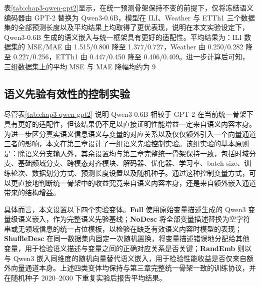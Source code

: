 表\ref{tab:chap3-qwen-gpt2}显示，在统一预测骨架保持不变的前提下，仅将冻结语义编码器由 GPT-2 替换为 Qwen3-0.6B，模型在 ILI、Weather 与 ETTh1 三个数据集的全部预测长度以及平均结果上均取得了更优表现，说明在本文实验设定下，Qwen3-0.6B 生成的语义嵌入与统一框架具有更好的适配性。平均结果为：ILI 数据集的 MSE/MAE 由 1.515/0.800 降至 1.377/0.727，Weather 由 0.250/0.282 降至 0.227/0.256，ETTh1 由 0.447/0.450 降至 0.406/0.409。进一步计算后可知，三组数据集上的平均 MSE 与 MAE 降幅均约为 9%

\subsection{语义先验有效性的控制实验}
尽管表\ref{tab:chap3-qwen-gpt2} 说明 Qwen3-0.6B 相较于 GPT-2 在当前统一骨架下具有更好的适配性，但该结果仍不足以直接证明性能增益一定来自语义内容本身。为进一步区分真实语义信息语义与变量的对应关系以及仅仅额外引入一个向量通道三者的影响，本文在第三章设计了一组语义先验控制实验。该组实验的基本原则是：除语义分支输入外，其余设置均与第三章完整统一骨架保持一致，包括时域分支、基础频域分支、跨模态对齐模块、解码器、优化器、学习率、batch size、训练轮次、数据划分方式、预测长度设置以及随机种子。通过这种控制变量方式，可以更直接地判断统一骨架中的收益究竟来自语义内容本身，还是来自额外嵌入通道带来的结构增益。

具体而言，本文设置以下四个实验变体。\textbf{Full} 使用原始变量描述生成的 Qwen3 变量级语义嵌入，作为完整语义先验基线；\textbf{NoDesc} 将全部变量描述替换为空字符串或无领域信息的统一占位模板，以检验在缺乏有效语义内容时模型的表现；\textbf{ShuffleDesc} 在同一数据集内固定一次随机置换，将变量描述错误地分配给其他变量，用于检验语义描述与变量之间的正确对应关系是否关键；\textbf{RandEmb} 则以与 Qwen3 嵌入同维度的随机向量替代语义嵌入，用于检验性能收益是否仅来自额外向量通道本身。上述四类变体均保持与第三章完整统一骨架一致的训练协议，并在随机种子 2020--2030 下重复实验后报告平均结果。

